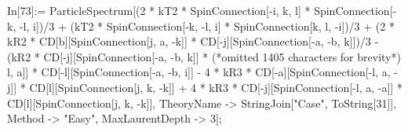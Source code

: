 In[73]:= ParticleSpectrum[(2 * kT2 * SpinConnection[-i, k, l] * SpinConnection[-k, -l, i])/3 + (kT2 * SpinConnection[-k, -l, i] * SpinConnection[k, l, -i])/3 + (2 * kR2 * CD[b][SpinConnection[j, a, -k]] * CD[-j][SpinConnection[-a, -b, k]])/3 - (kR2 * CD[-j][SpinConnection[-a, -b, k]] * (*omitted 1405 characters for brevity*) l, a]] * CD[-l][SpinConnection[-a, -b, i]] - 4 * kR3 * CD[-a][SpinConnection[-l, a, -j]] * CD[l][SpinConnection[j, k, -k]] + 4 * kR3 * CD[-j][SpinConnection[-l, a, -a]] * CD[l][SpinConnection[j, k, -k]], TheoryName -> StringJoin["Case", ToString[31]], Method -> "Easy", MaxLaurentDepth -> 3];